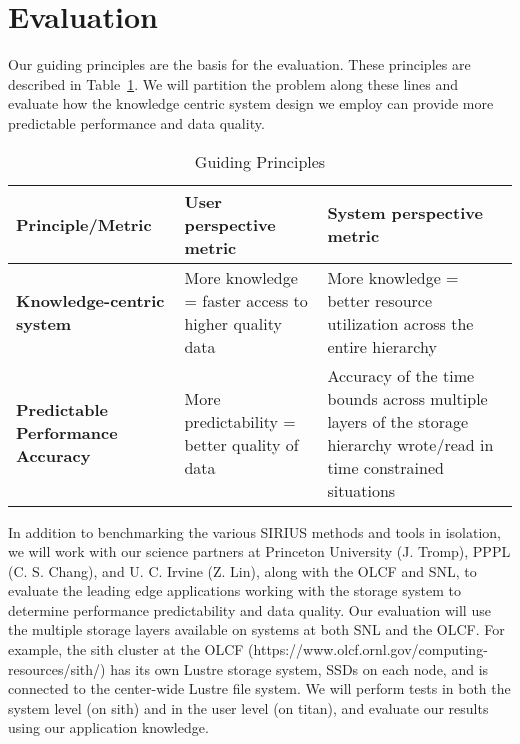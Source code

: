 \section{Evaluation}
\label{sec:evaluation}

Our guiding principles are the basis for the evaluation. These principles are
described in Table~\ref{table:eval}.  We will partition the problem along these
lines and evaluate how the knowledge centric system design we employ can
provide more predictable performance and data quality. 

\begin{table}[ht]

\centering
\caption{Guiding Principles}
\label{table:eval}
\begin{tabular}{ | p{1.4in} | p{2in} | p{2.5in} | }
  \hline
  {\bf Principle/Metric}                   & {\bf User perspective metric}   & {\bf System perspective metric }\\ \hline
  {\bf Knowledge-centric system}           & More knowledge = faster access to higher quality data &  More knowledge = better resource utilization across the entire hierarchy \\ \hline
  {\bf Predictable Performance Accuracy}   & More predictability = better quality of data &  Accuracy of the time bounds across multiple layers of the storage hierarchy wrote/read in time constrained situations\\ \hline
\end{tabular}
\end{table}

In addition to benchmarking the various SIRIUS methods and tools in isolation,
we will work with our science partners at Princeton University (J. Tromp),
PPPL (C. S. Chang), and U. C. Irvine (Z. Lin), along with the OLCF and SNL,
to evaluate the leading edge applications working with the storage system to
determine performance predictability and data quality.  Our evaluation 
will use the multiple storage layers available on systems at both SNL and the
OLCF.  For example, the sith cluster at the OLCF
(https://www.olcf.ornl.gov/computing-resources/sith/) has its own Lustre
storage system, SSDs on each node, and is connected to the center-wide Lustre
file system. We will perform tests in both the system level (on sith) and in
the user level (on titan), and evaluate our results using our application
knowledge.

